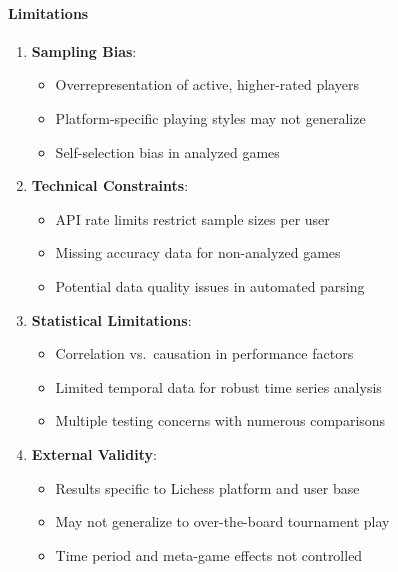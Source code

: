 \documentclass[
]{article}
\providecommand{\tightlist}{%
  \setlength{\itemsep}{0pt}\setlength{\parskip}{0pt}}
\begin{document}
\paragraph{Limitations}\label{limitations}

\begin{enumerate}
\def\labelenumi{\arabic{enumi}.}
\tightlist
\item
  \textbf{Sampling Bias}:

  \begin{itemize}
  \tightlist
  \item
    Overrepresentation of active, higher-rated players
  \item
    Platform-specific playing styles may not generalize
  \item
    Self-selection bias in analyzed games
  \end{itemize}
\item
  \textbf{Technical Constraints}:

  \begin{itemize}
  \tightlist
  \item
    API rate limits restrict sample sizes per user
  \item
    Missing accuracy data for non-analyzed games
  \item
    Potential data quality issues in automated parsing
  \end{itemize}
\item
  \textbf{Statistical Limitations}:

  \begin{itemize}
  \tightlist
  \item
    Correlation vs.~causation in performance factors
  \item
    Limited temporal data for robust time series analysis\\
  \item
    Multiple testing concerns with numerous comparisons
  \end{itemize}
\item
  \textbf{External Validity}:

  \begin{itemize}
  \tightlist
  \item
    Results specific to Lichess platform and user base
  \item
    May not generalize to over-the-board tournament play
  \item
    Time period and meta-game effects not controlled
  \end{itemize}
\end{enumerate}
\end{document}
